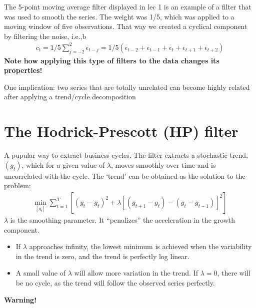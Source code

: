 \documentclass[10pt]{article}
\begin{document}
The 5-point moving average filter displayed in lec 1 is an example of a filter that was used to smooth the series. The weight was 1/5, which was applied to a moving window of five observations. That way we created a cyclical component by filtering the noise, i.e.,b
\begin{gather*}
    c_t = 1/5 \sum_{j = -2}^{2}\epsilon_{t - j} = 1/5(\epsilon_{t - 2} + \epsilon_{t - 1} + \epsilon_{t} + \epsilon_{t + 1} + \epsilon_{t + 2})
\end{gather*}
\textbf{Note how applying this type of filters to the data changes its properties!}

One implication: two series that are totally unrelated can become highly related after applying a trend/cycle decomposition
\newpage 
\section{The Hodrick-Prescott (HP) filter}
A pupular way to extract business cycles. The filter extracts a stochastic trend, $(g_t) $, which for a given value of $\lambda $, moves smoothly over time and is uncorrelated with the cycle. The `trend' can be obtained as the solution to the problem: 
\begin{gather*}
    \min_{[g_t]}\sum_{t = 1}^{T}\left[(y_t - g_t)^2 + \lambda[(g_{t + 1} - g_t) - (g_t - g_{t - 1})]^2\right]
\end{gather*}
$\lambda $ is the smoothing parameter. It ``penalizes'' the acceleration in the growth component. 
\begin{itemize}
    \item If $\lambda $ approaches infinity, the lowest minimum is achieved when the variability in the trend is zero, and the trend is perfectly log linear. 
    \item A small value of $\lambda $ will allow more variation in the trend. If $\lambda = 0 $, there will be no cycle, as the trend will follow the observed series perfectly. 
\end{itemize}
\textbf{Warning!}
\end{document}
